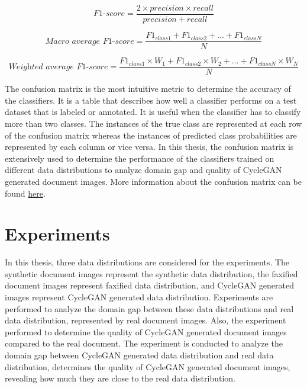 

\begin{equation}\label{F1-score}
\textit{F1-score} = \frac{2 \times precision \times recall}{precision + recall}
\end{equation}


\begin{equation}\label{macrof1-score} 
\textit{Macro average F1-score} =  \frac{F1_{class1} + F1_{class2}+ ... + F1_{classN}}{N}
\end{equation}


\begin{equation}\label{Weightedf1-score} 
\textit{Weighted average F1-score} =  \frac{F1_{class1} \times W_1 + F1_{class2} \times W_2 + ... + F1_{classN} \times W_N}{N}
\end{equation}

The confusion matrix is the most intuitive metric to determine the accuracy of the classifiers. It is a table that describes how well a classifier performs on a test dataset that is labeled or annotated. It is useful when the classifier has to classify more than two classes. The instances of the true class are represented at each row of the confusion matrix whereas the instances of predicted class probabilities are represented by each column or vice versa. In this thesis, the confusion matrix is extensively used to determine the performance of the classifiers trained on different data distributions to analyze domain gap and quality of \ac{CycleGAN} generated document images. More information about the confusion matrix can be found \href{https://en.wikipedia.org/wiki/Confusion_matrix}{here}.



\section{Experiments}\label{experiments}

In this thesis, three data distributions are considered for the experiments. The synthetic document images represent the synthetic data distribution, the faxified document images represent faxified data distribution, and \ac{CycleGAN} generated images represent \ac{CycleGAN} generated data distribution. Experiments are performed to analyze the domain gap between these data distributions and real data distribution, represented by real document images. Also, the experiment performed to determine the quality of \ac{CycleGAN} generated document images compared to the real document. The experiment is conducted to analyze the domain gap between \ac{CycleGAN} generated data distribution and real data distribution, determines the quality of \ac{CycleGAN} generated document images, revealing how much they are close to the real data distribution.

